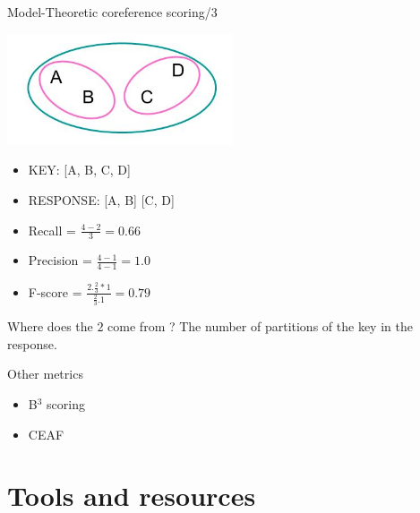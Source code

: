 \documentclass[dvipsnames, 10pt, compress]{beamer}
\begin{document}
\begin{frame}{Model-Theoretic coreference scoring/3}

\begin{center}
\includegraphics[width=0.5\textwidth]{graphics/coref-scoring-1.png}
\end{center}

\begin{itemize}
  \item KEY: [A, B, C, D]
  \item RESPONSE: [A, B] [C, D]
\end{itemize}

\begin{itemize}
  \item Recall = $\frac{4 - 2}{3} = 0.66$
  \item Precision = $\frac{4 - 1}{4 - 1} = 1.0$
  \item F-score = $\frac{2 . \frac{2}{3} * 1}{\frac{2}{3} . 1} = 0.79$
\end{itemize}

Where does the $2$ come from ? The number of partitions of the key in the response.

\end{frame}

\begin{frame}{Other metrics}

\begin{itemize}
   \item B$^3$ scoring
    \item CEAF
\end{itemize}

\end{frame}

\section{Tools and resources}
\end{document}
